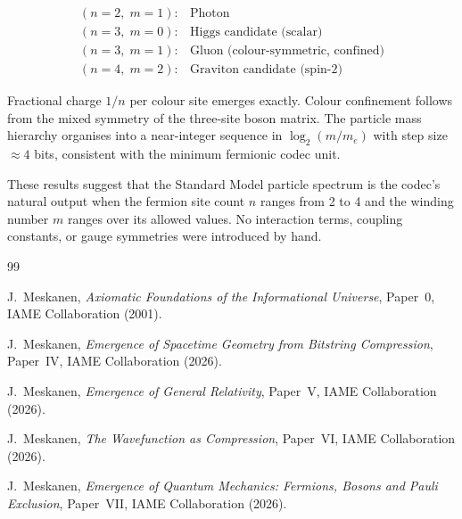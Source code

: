 \documentclass[11pt]{article}
\begin{document}
\[
\begin{array}{ll}
(n=2,\; m=1): & \text{Photon} \\
(n=3,\; m=0): & \text{Higgs candidate (scalar)} \\
(n=3,\; m=1): & \text{Gluon (colour-symmetric, confined)} \\
(n=4,\; m=2): & \text{Graviton candidate (spin-2)}
\end{array}
\]

Fractional charge $1/n$ per colour site emerges exactly.
Colour confinement follows from the mixed symmetry of the three-site
boson matrix.
The particle mass hierarchy organises into a near-integer sequence in
$\log_2(m/m_e)$ with step size $\approx 4$ bits, consistent with the
minimum fermionic codec unit.

These results suggest that the Standard Model particle spectrum is the
codec's natural output when the fermion site count $n$ ranges from 2
to 4 and the winding number $m$ ranges over its allowed values.
No interaction terms, coupling constants, or gauge symmetries were
introduced by hand.

\begin{thebibliography}{99}

J.~Meskanen,
\textit{Axiomatic Foundations of the Informational Universe},
Paper~0, IAME Collaboration (2001).

J.~Meskanen,
\textit{Emergence of Spacetime Geometry from Bitstring Compression},
Paper~IV, IAME Collaboration (2026).

J.~Meskanen,
\textit{Emergence of General Relativity},
Paper~V, IAME Collaboration (2026).

J.~Meskanen,
\textit{The Wavefunction as Compression},
Paper~VI, IAME Collaboration (2026).

J.~Meskanen,
\textit{Emergence of Quantum Mechanics: Fermions, Bosons and Pauli Exclusion},
Paper~VII, IAME Collaboration (2026).

\end{thebibliography}
\end{document}
